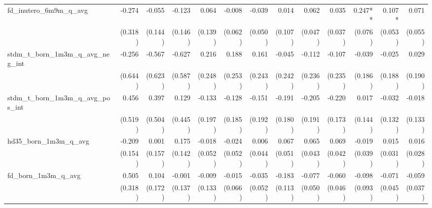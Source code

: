 \begin{tabular}{lrrrrrrrrrrrr}
fd\_inutero\_6m9m\_q\_avg                   &       -0.274 &       -0.055 &       -0.123 &        0.064 &       -0.008 &       -0.039 &        0.014 &        0.062 &        0.035 &      0.247** &       0.107* &        0.071 \\ 
                                            &      (0.318) &      (0.144) &      (0.146) &      (0.139) &      (0.062) &      (0.050) &      (0.107) &      (0.047) &      (0.037) &      (0.076) &      (0.053) &      (0.055) \\ 
stdm\_t\_born\_1m3m\_q\_avg\_neg\_int       &       -0.256 &       -0.567 &       -0.627 &        0.216 &        0.188 &        0.161 &       -0.045 &       -0.112 &       -0.107 &       -0.039 &       -0.025 &        0.029 \\ 
                                            &      (0.644) &      (0.623) &      (0.587) &      (0.248) &      (0.253) &      (0.243) &      (0.242) &      (0.236) &      (0.235) &      (0.186) &      (0.188) &      (0.190) \\ 
stdm\_t\_born\_1m3m\_q\_avg\_pos\_int       &        0.456 &        0.397 &        0.129 &       -0.133 &       -0.128 &       -0.151 &       -0.191 &       -0.205 &       -0.220 &        0.017 &       -0.032 &       -0.018 \\ 
                                            &      (0.519) &      (0.504) &      (0.445) &      (0.197) &      (0.185) &      (0.192) &      (0.180) &      (0.191) &      (0.173) &      (0.144) &      (0.132) &      (0.133) \\ 
hd35\_born\_1m3m\_q\_avg                    &       -0.209 &        0.001 &        0.175 &       -0.018 &       -0.024 &        0.006 &        0.067 &        0.065 &        0.069 &       -0.019 &        0.015 &        0.016 \\ 
                                            &      (0.154) &      (0.157) &      (0.142) &      (0.052) &      (0.052) &      (0.044) &      (0.051) &      (0.043) &      (0.042) &      (0.039) &      (0.031) &      (0.028) \\ 
fd\_born\_1m3m\_q\_avg                      &        0.505 &        0.104 &       -0.001 &       -0.009 &       -0.015 &       -0.035 &       -0.183 &       -0.077 &       -0.060 &       -0.098 &       -0.071 &       -0.059 \\ 
                                            &      (0.318) &      (0.172) &      (0.137) &      (0.133) &      (0.066) &      (0.052) &      (0.113) &      (0.050) &      (0.046) &      (0.093) &      (0.045) &      (0.037) \\ 

\end{tabular}
